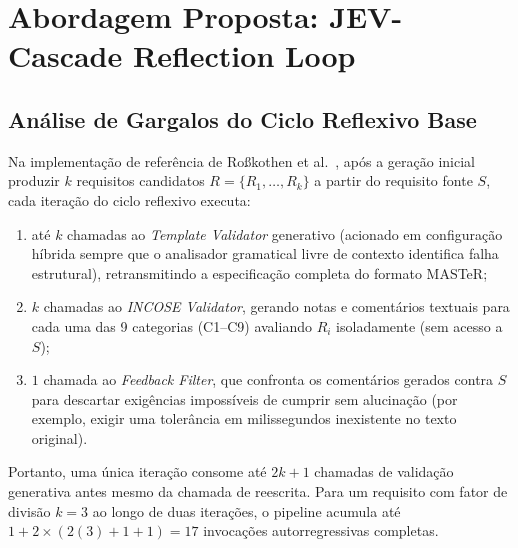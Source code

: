\section{Abordagem Proposta: JEV-Cascade Reflection Loop}

\subsection{Análise de Gargalos do Ciclo Reflexivo Base}
Na implementação de referência de Ro\ss kothen et al.~\cite{rosskothen2026converting, rosskothen2026zenodo}, após a geração inicial produzir $k$ requisitos candidatos $R = \{R_1, \dots, R_k\}$ a partir do requisito fonte $S$, cada iteração do ciclo reflexivo executa:
\begin{enumerate}
    \item até $k$ chamadas ao \textit{Template Validator} generativo (acionado em configuração híbrida sempre que o analisador gramatical livre de contexto identifica falha estrutural), retransmitindo a especificação completa do formato MASTeR;
    \item $k$ chamadas ao \textit{INCOSE Validator}, gerando notas e comentários textuais para cada uma das 9 categorias (C1--C9) avaliando $R_i$ isoladamente (sem acesso a $S$);
    \item $1$ chamada ao \textit{Feedback Filter}, que confronta os comentários gerados contra $S$ para descartar exigências impossíveis de cumprir sem alucinação (por exemplo, exigir uma tolerância em milissegundos inexistente no texto original).
\end{enumerate}
Portanto, uma única iteração consome até $2k + 1$ chamadas de validação generativa antes mesmo da chamada de reescrita. Para um requisito com fator de divisão $k = 3$ ao longo de duas iterações, o pipeline acumula até $1 + 2 \times (2(3) + 1 + 1) = 17$ invocações autorregressivas completas.

